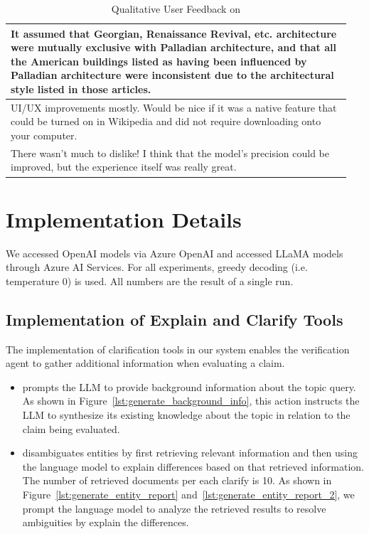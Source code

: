 \begin{table}[htbp]
\begin{tabular}{p{0.95\linewidth}}
\midrule
It assumed that Georgian, Renaissance Revival, etc. architecture were mutually exclusive with Palladian architecture, and that all the American buildings listed as having been influenced by Palladian architecture were inconsistent due to the architectural style listed in those articles. \\
\midrule
UI/UX improvements mostly. Would be nice if it was a native feature that could be turned on in Wikipedia and did not require downloading onto your computer. \\
\midrule
There wasn't much to dislike! I think that the model's precision could be improved, but the experience itself was really great. \\
\bottomrule
\end{tabular}
\caption{Qualitative User Feedback on \system}
\label{tab:user_feedback}
\end{table}






\section{Implementation Details}
\label{sec:system_implementations}
We accessed OpenAI models via Azure OpenAI and accessed LLaMA models through Azure AI Services. For all experiments, greedy decoding (i.e. temperature 0) is used.
All numbers are the result of a single run.

\subsection{Implementation of Explain and Clarify Tools}
\label{sec:tools_implementation}

The implementation of clarification tools in our system enables the verification agent to gather additional information when evaluating a claim. 

\begin{itemize}
    \item {} prompts the LLM to provide background information about the topic query. As shown in Figure~\ref{lst:generate_background_info}, this action instructs the LLM to synthesize its existing knowledge about the topic in relation to the claim being evaluated.
    \item {} disambiguates entities by first retrieving relevant information and then using the language model to explain differences based on that retrieved information. The number of retrieved documents per each clarify is 10. As shown in Figure~\ref{lst:generate_entity_report} and~\ref{lst:generate_entity_report_2}, we prompt the language model to analyze the retrieved results to resolve ambiguities by explain the differences.
\end{itemize}

